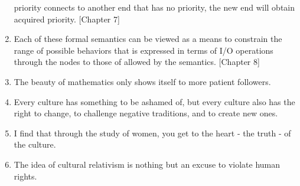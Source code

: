 \begin{enumerate}
priority connects to another end that has no priority, the new end will obtain
acquired priority. [Chapter 7]
\item Each of these formal semantics can be viewed as a means to constrain the
range of possible behaviors that is expressed in terms of I/O operations through
the nodes to those of allowed by the semantics. [Chapter 8]
\item The beauty of mathematics only shows itself to more patient followers.
\item Every culture has something to be ashamed of, but every culture also has the right to change, to challenge negative traditions, and to create new ones.
\item I find that through the study of women, you get to the heart - the truth - of the culture.
\item The idea of cultural relativism is nothing but an excuse to violate human rights.
\end{enumerate}

